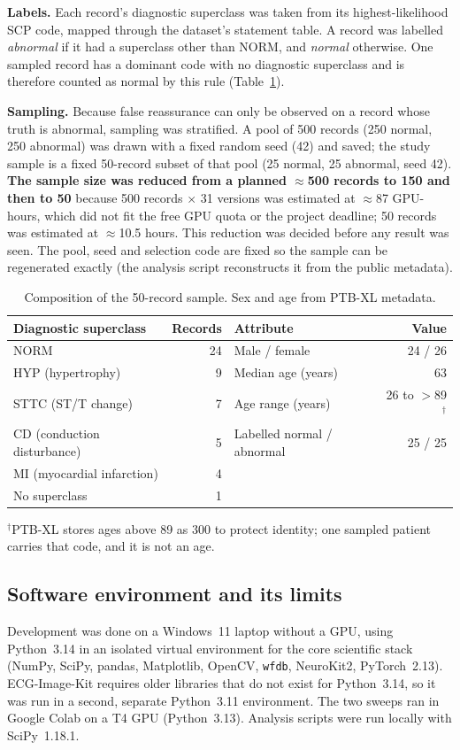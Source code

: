 \textbf{Labels.} Each record's diagnostic superclass was taken from its highest-likelihood SCP code, mapped through the dataset's statement table. A record was labelled \emph{abnormal} if it had a superclass other than NORM, and \emph{normal} otherwise. One sampled record has a dominant code with no diagnostic superclass and is therefore counted as normal by this rule (Table~\ref{tab:sample}).

\textbf{Sampling.} Because false reassurance can only be observed on a record whose truth is abnormal, sampling was stratified. A pool of 500 records (250 normal, 250 abnormal) was drawn with a fixed random seed (42) and saved; the study sample is a fixed 50-record subset of that pool (25 normal, 25 abnormal, seed 42). \textbf{The sample size was reduced from a planned $\approx$500 records to 150 and then to 50} because 500 records $\times$ 31 versions was estimated at $\approx$87 GPU-hours, which did not fit the free GPU quota or the project deadline; 50 records was estimated at $\approx$10.5 hours. This reduction was decided before any result was seen. The pool, seed and selection code are fixed so the sample can be regenerated exactly (the analysis script reconstructs it from the public metadata).

\begin{table}[ht]
\centering\small
\caption{Composition of the 50-record sample. Sex and age from PTB-XL metadata.}\label{tab:sample}
\begin{tabular}{@{}lr@{\qquad}lr@{}}
\toprule
Diagnostic superclass & Records & Attribute & Value \\
\midrule
NORM & 24 & Male / female & 24 / 26 \\
HYP (hypertrophy) & 9 & Median age (years) & 63 \\
STTC (ST/T change) & 7 & Age range (years) & 26 to $>$89$^{\dagger}$ \\
CD (conduction disturbance) & 5 & Labelled normal / abnormal & 25 / 25 \\
MI (myocardial infarction) & 4 & & \\
No superclass & 1 & & \\
\bottomrule
\end{tabular}

\smallskip
\footnotesize $^{\dagger}$PTB-XL stores ages above 89 as 300 to protect identity; one sampled patient carries that code, and it is not an age.
\end{table}

\subsection{Software environment and its limits}
Development was done on a Windows~11 laptop without a GPU, using Python~3.14 in an isolated virtual environment for the core scientific stack (NumPy, SciPy, pandas, Matplotlib, OpenCV, \texttt{wfdb}, NeuroKit2, PyTorch~2.13). ECG-Image-Kit requires older libraries that do not exist for Python~3.14, so it was run in a second, separate Python~3.11 environment. The two sweeps ran in Google Colab on a T4 GPU (Python~3.13). Analysis scripts were run locally with SciPy~1.18.1.

